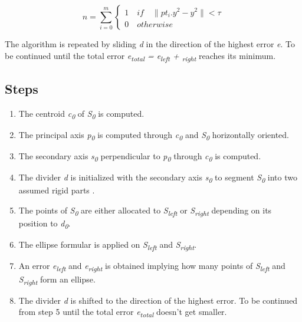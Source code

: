 \documentclass[a4paper,english,11pt]{report}
\begin{document}
\begin{equation}
n = \sum_{i=0}^{m}\begin{cases}1 \quad if \quad \|pt_i.y^2 - y^2 \| < \tau \\ 0 \quad otherwise\end{cases}
\end{equation}

The algorithm is repeated by sliding \textit{d} in the direction of the highest error \textit{e}. To be continued until the total error \textit{e\textsubscript{total} = e\textsubscript{left} + \textsubscript{right}} reaches its minimum.

\subsection{Steps}

\begin{enumerate}
	\item The centroid \textit{c\textsubscript{0}}  of \textit{S\textsubscript{0}} is computed.
	
	\item The principal axis \textit{p\textsubscript{0}} is computed through \textit{c\textsubscript{0}} and \textit{S\textsubscript{0}} horizontally oriented. 
	
	\item The secondary axis \textit{s\textsubscript{0}}  perpendicular to \textit{p\textsubscript{0}} through \textit{c\textsubscript{0}} is computed.
	
	\item The divider \textit{d} is initialized with the secondary axis \textit{s\textsubscript{0}} to segment \textit{S\textsubscript{0}} into two assumed rigid parts .
	
	\item The points of \textit{S\textsubscript{0}} are either allocated to \textit{S\textsubscript{left}} or \textit{S\textsubscript{right}} depending on its position to \textit{d\textsubscript{0}}.
	
	\item The ellipse formular is applied on \textit{S\textsubscript{left}} and \textit{S\textsubscript{right}}.
	
	\item An error \textit{e\textsubscript{left}} and \textit{e\textsubscript{right}} is obtained implying how many points of \textit{S\textsubscript{left}} and \textit{S\textsubscript{right}} form an ellipse. 
	
	\item The divider \textit{d} is shifted to the direction of the highest error. To be continued from step 5 until the total error \textit{e\textsubscript{total}} doesn't get smaller. 
\end{enumerate}
\end{document}
